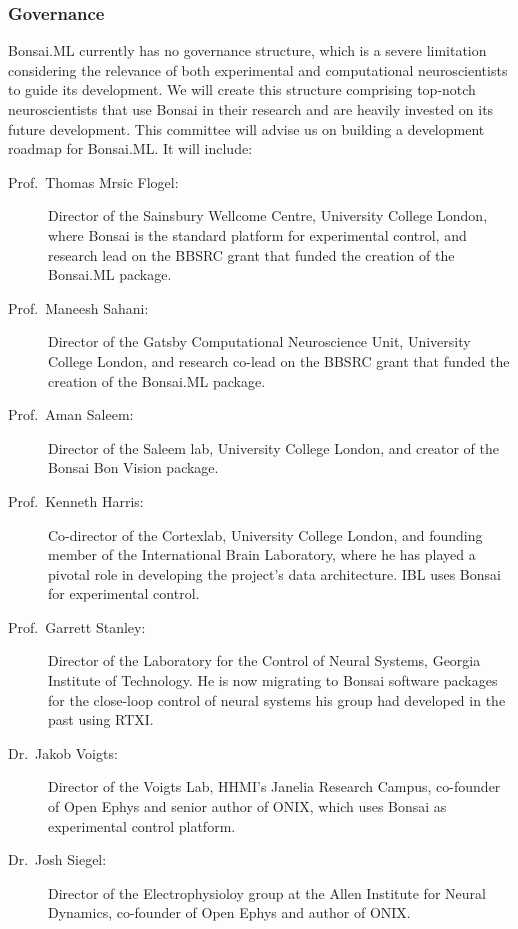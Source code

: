 \subsubsection*{Governance}

Bonsai.ML currently has no governance structure, which is a severe limitation
considering the relevance of both experimental and computational
neuroscientists to guide its development.
%
We will create this structure comprising top-notch neuroscientists that use
Bonsai in their research and are heavily invested on its future development.
%
This committee will advise us on building a development roadmap for Bonsai.ML.
It will include:

\begin{description}

    \item[Prof.~Thomas Mrsic Flogel:] Director of the Sainsbury Wellcome
        Centre, University College London, where Bonsai is the standard
        platform for experimental control, and research lead on the BBSRC grant
        that funded the creation of the Bonsai.ML package.

    \item[Prof.~Maneesh Sahani:] Director of the Gatsby Computational
        Neuroscience Unit, University College London, and research co-lead on
        the BBSRC grant that funded the creation of the Bonsai.ML package.

    \item[Prof.~Aman Saleem:] Director of the Saleem lab, University College
        London, and creator of the Bonsai Bon Vision package.

    \item[Prof.~Kenneth Harris:] Co-director of the Cortexlab, University
        College London, and founding member of the International Brain
        Laboratory, where he has played a pivotal role in developing the
        project's data architecture. IBL uses Bonsai for experimental control.

    \item[Prof.~Garrett Stanley:] Director of the Laboratory for the Control of
        Neural Systems, Georgia Institute of Technology. He is now migrating to
        Bonsai software packages for the close-loop control of neural systems
        his group had developed in the past using RTXI.

    \item[Dr.~Jakob Voigts:] Director of the Voigts Lab, HHMI's Janelia
        Research Campus, co-founder of Open Ephys and senior author of ONIX,
        which uses Bonsai as experimental control platform.

    \item[Dr.~Josh Siegel:] Director of the Electrophysioloy group at the Allen
        Institute for Neural Dynamics, co-founder of Open Ephys and author of
        ONIX.
        
\end{description}
